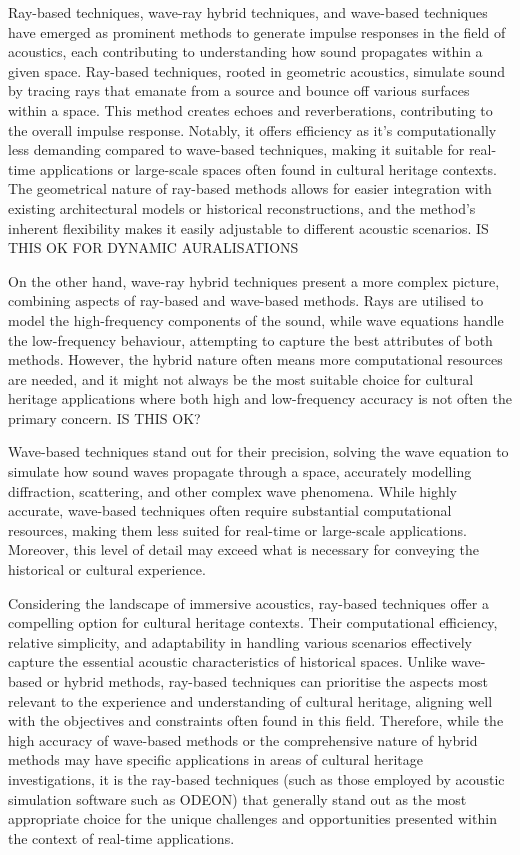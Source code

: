 Ray-based techniques, wave-ray hybrid techniques, and wave-based techniques have emerged as prominent methods to generate impulse responses in the field of acoustics, each contributing to understanding how sound propagates within a given space. Ray-based techniques, rooted in geometric acoustics, simulate sound by tracing rays that emanate from a source and bounce off various surfaces within a space. This method creates echoes and reverberations, contributing to the overall impulse response. Notably, it offers efficiency as it's computationally less demanding compared to wave-based techniques, making it suitable for real-time applications or large-scale spaces often found in cultural heritage contexts. The geometrical nature of ray-based methods allows for easier integration with existing architectural models or historical reconstructions, and the method's inherent flexibility makes it easily adjustable to different acoustic scenarios. IS THIS OK FOR DYNAMIC AURALISATIONS

On the other hand, wave-ray hybrid techniques present a more complex picture, combining aspects of ray-based and wave-based methods. Rays are utilised to model the high-frequency components of the sound, while wave equations handle the low-frequency behaviour, attempting to capture the best attributes of both methods. However, the hybrid nature often means more computational resources are needed, and it might not always be the most suitable choice for cultural heritage applications where both high and low-frequency accuracy is not often the primary concern. IS THIS OK?

Wave-based techniques stand out for their precision, solving the wave equation to simulate how sound waves propagate through a space, accurately modelling diffraction, scattering, and other complex wave phenomena. While highly accurate, wave-based techniques often require substantial computational resources, making them less suited for real-time or large-scale applications. Moreover, this level of detail may exceed what is necessary for conveying the historical or cultural experience.

Considering the landscape of immersive acoustics, ray-based techniques offer a compelling option for cultural heritage contexts. Their computational efficiency, relative simplicity, and adaptability in handling various scenarios effectively capture the essential acoustic characteristics of historical spaces. Unlike wave-based or hybrid methods, ray-based techniques can prioritise the aspects most relevant to the experience and understanding of cultural heritage, aligning well with the objectives and constraints often found in this field. Therefore, while the high accuracy of wave-based methods or the comprehensive nature of hybrid methods may have specific applications in areas of cultural heritage investigations, it is the ray-based techniques (such as those employed by acoustic simulation software such as ODEON) that generally stand out as the most appropriate choice for the unique challenges and opportunities presented within the context of real-time applications.

